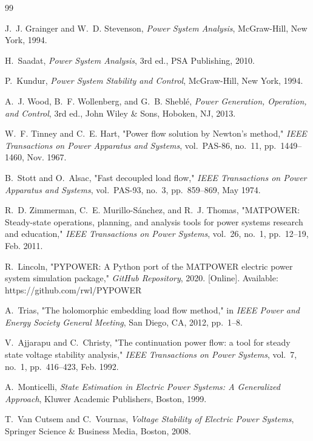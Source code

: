 \documentclass[12pt,a4paper,oneside]{report}
\begin{document}
\begin{thebibliography}{99}

J.~J. Grainger and W.~D. Stevenson, \textit{Power System Analysis}, McGraw-Hill, New York, 1994.

H.~Saadat, \textit{Power System Analysis}, 3rd ed., PSA Publishing, 2010.

P.~Kundur, \textit{Power System Stability and Control}, McGraw-Hill, New York, 1994.

A.~J. Wood, B.~F. Wollenberg, and G.~B. Shebl\'e, \textit{Power Generation, Operation, and Control}, 3rd ed., John Wiley \& Sons, Hoboken, NJ, 2013.

W.~F. Tinney and C.~E. Hart, "Power flow solution by Newton's method," \textit{IEEE Transactions on Power Apparatus and Systems}, vol.~PAS-86, no.~11, pp.~1449--1460, Nov. 1967.

B.~Stott and O.~Alsac, "Fast decoupled load flow," \textit{IEEE Transactions on Power Apparatus and Systems}, vol.~PAS-93, no.~3, pp.~859--869, May 1974.

R.~D. Zimmerman, C.~E. Murillo-S\'anchez, and R.~J. Thomas, "MATPOWER: Steady-state operations, planning, and analysis tools for power systems research and education," \textit{IEEE Transactions on Power Systems}, vol.~26, no.~1, pp.~12--19, Feb. 2011.

R.~Lincoln, "PYPOWER: A Python port of the MATPOWER electric power system simulation package," \textit{GitHub Repository}, 2020. [Online]. Available: https://github.com/rwl/PYPOWER

A.~Trias, "The holomorphic embedding load flow method," in \textit{IEEE Power and Energy Society General Meeting}, San Diego, CA, 2012, pp.~1--8.

V.~Ajjarapu and C.~Christy, "The continuation power flow: a tool for steady state voltage stability analysis," \textit{IEEE Transactions on Power Systems}, vol.~7, no.~1, pp.~416--423, Feb. 1992.

A.~Monticelli, \textit{State Estimation in Electric Power Systems: A Generalized Approach}, Kluwer Academic Publishers, Boston, 1999.

T.~Van Cutsem and C.~Vournas, \textit{Voltage Stability of Electric Power Systems}, Springer Science \& Business Media, Boston, 2008.


\end{thebibliography}
\end{document}
